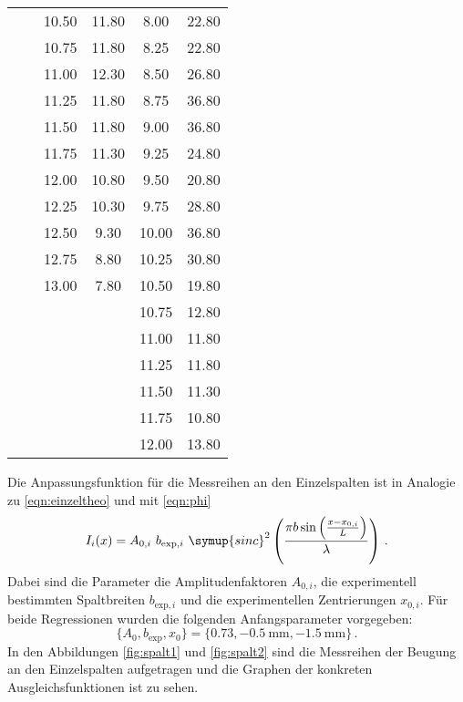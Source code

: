 \begin{longtable}{S[table-format=3.2] S[table-format=3.2] S[table-format=3.2] S[table-format=3.2] S[table-format=3.2] S[table-format=3.2]}
                     &     & 10.50 & 11.80 & 8.00 & 22.80\\
                     &     & 10.75 & 11.80 & 8.25 & 22.80\\
                     &     & 11.00 & 12.30 & 8.50 & 26.80\\
                     &     & 11.25 & 11.80 & 8.75 & 36.80\\
                     &     & 11.50 & 11.80 & 9.00 & 36.80\\
                     &     & 11.75 & 11.30 & 9.25 & 24.80\\
                     &     & 12.00 & 10.80 & 9.50 & 20.80\\
                     &     & 12.25 & 10.30 & 9.75 & 28.80\\
                     &     & 12.50 & 9.30 & 10.00 & 36.80\\
                     &     & 12.75 & 8.80 & 10.25 & 30.80\\
                     &     & 13.00 & 7.80 & 10.50 & 19.80\\
                     &     &    &  & 10.75 & 12.80\\
                     &     &    &  & 11.00 & 11.80\\
                     &     &    &  & 11.25 & 11.80\\
                     &     &    &  & 11.50 & 11.30\\
                     &     &    &  & 11.75 & 10.80\\
                     &     &    &  & 12.00 & 13.80\\
                \bottomrule
\end{longtable}

Die Anpassungsfunktion für die Messreihen an den Einzelspalten ist in Analogie zu
\eqref{eqn:einzeltheo} und mit \eqref{eqn:phi}
\begin{equation*}
  I_i (x) = A_{0,i} \,\, b_{\text{exp},i} \,\, \symup{sinc}^2\left(\frac{\pi b \sin\left(\frac{x-x_{0,i}}{L}\right)}{\lambda}\right) \,.
\end{equation*}
Dabei sind die Parameter die Amplitudenfaktoren $A_{0,i}$, die experimentell bestimmten Spaltbreiten
$b_{\text{exp},i}$ und die experimentellen Zentrierungen $x_{0,i}$.
Für beide Regressionen wurden die folgenden Anfangsparameter vorgegeben:
\begin{equation*}
  \{A_0, b_{\text{exp}}, x_0\} = \{0.73, \SI{-0.5}{\milli\meter}, \SI{-1.5}{\milli\meter}\}\,.
\end{equation*}
In den Abbildungen \ref{fig:spalt1} und \ref{fig:spalt2} sind die Messreihen der Beugung an den Einzelspalten aufgetragen
und die Graphen der konkreten Ausgleichsfunktionen ist zu sehen.

